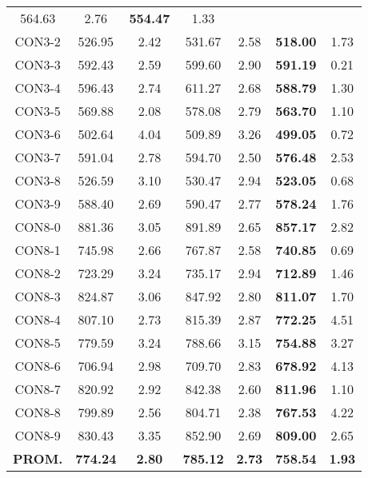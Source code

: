 \begin{table}[ht]
\begin{tabular}{c c c c c c c}
564.63 & 2.76 & \bf{554.47} & 
1.33\\CON3-2 & 526.95 & 2.42 & 
531.67 & 2.58 & \bf{518.00} & 
1.73\\CON3-3 & 592.43 & 2.59 & 
599.60 & 2.90 & \bf{591.19} & 
0.21\\CON3-4 & 596.43 & 2.74 & 
611.27 & 2.68 & \bf{588.79} & 
1.30\\CON3-5 & 569.88 & 2.08 & 
578.08 & 2.79 & \bf{563.70} & 
1.10\\CON3-6 & 502.64 & 4.04 & 
509.89 & 3.26 & \bf{499.05} & 
0.72\\CON3-7 & 591.04 & 2.78 & 
594.70 & 2.50 & \bf{576.48} & 
2.53\\CON3-8 & 526.59 & 3.10 & 
530.47 & 2.94 & \bf{523.05} & 
0.68\\CON3-9 & 588.40 & 2.69 & 
590.47 & 2.77 & \bf{578.24} & 
1.76\\CON8-0 & 881.36 & 3.05 & 
891.89 & 2.65 & \bf{857.17} & 
2.82\\CON8-1 & 745.98 & 2.66 & 
767.87 & 2.58 & \bf{740.85} & 
0.69\\CON8-2 & 723.29 & 3.24 & 
735.17 & 2.94 & \bf{712.89} & 
1.46\\CON8-3 & 824.87 & 3.06 & 
847.92 & 2.80 & \bf{811.07} & 
1.70\\CON8-4 & 807.10 & 2.73 & 
815.39 & 2.87 & \bf{772.25} & 
4.51\\CON8-5 & 779.59 & 3.24 & 
788.66 & 3.15 & \bf{754.88} & 
3.27\\CON8-6 & 706.94 & 2.98 & 
709.70 & 2.83 & \bf{678.92} & 
4.13\\CON8-7 & 820.92 & 2.92 & 
842.38 & 2.60 & \bf{811.96} & 
1.10\\CON8-8 & 799.89 & 2.56 & 
804.71 & 2.38 & \bf{767.53} & 
4.22\\CON8-9 & 830.43 & 3.35 & 
852.90 & 2.69 & \bf{809.00} & 
2.65\\\bf{PROM.} & 
\bf{774.24} & \bf{2.80} & \bf{785.12} & \bf{2.73} & \bf{758.54} & \bf{1.93}\\[1ex]\hline
\end{tabular}
\label{table:nonlin}
\end{table} \clearpage
